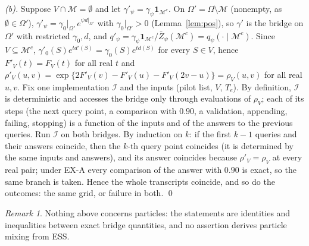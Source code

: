 \documentclass[11pt]{article}
\theoremstyle{remark}
\newtheorem{remark}[lemma]{Remark}
\newcommand{\Zb}{\bar Z}
\newcommand{\M}{\mathcal{M}}
\begin{document}
\emph{(b).} Suppose $V\cap\M=\emptyset$ and let $\gamma'_\psi=\gamma_\psi\mathbf 1_{\M^c}$. On $\Omega'=\Omega\setminus\M$ (nonempty, as $\emptyset\in\Omega'$), $\gamma'_\psi=\gamma_0|_{\Omega'}\,e^{\psi d|_{\Omega'}}$ with $\gamma_0|_{\Omega'}>0$ (Lemma~\ref{lem:pos}), so $\gamma'$ is the bridge on $\Omega'$ with restricted $\gamma_0,d$, and $q'_\psi=\gamma_\psi\mathbf 1_{\M^c}/\Zb_\psi(\M^c)=q_\psi(\cdot\mid\M^c)$. Since $V\subseteq\M^c$, $\gamma'_0(S)e^{td'(S)}=\gamma_0(S)e^{td(S)}$ for every $S\in V$, hence $F'_V(t)=F_V(t)$ for all real $t$ and $\rho'_V(u,v)=\exp\{2F'_V(v)-F'_V(u)-F'_V(2v-u)\}=\rho_V(u,v)$ for all real $u,v$.
Fix one implementation $\mathcal I$ and the inputs (pilot list, $V$, $T_e$). By definition, $\mathcal I$ is deterministic and accesses the bridge only through evaluations of $\rho_V$; each of its steps (the next query point, a comparison with $0.90$, a validation, appending, failing, stopping) is a function of the inputs and of the answers to the previous queries. Run $\mathcal I$ on both bridges. By induction on $k$: if the first $k-1$ queries and their answers coincide, then the $k$-th query point coincides (it is determined by the same inputs and answers), and its answer coincides because $\rho'_V=\rho_V$ at every real pair; under EX-A every comparison of the answer with $0.90$ is exact, so the same branch is taken. Hence the whole transcripts coincide, and so do the outcomes: the same grid, or failure in both. \qed

\begin{remark}
Nothing above concerns particles: the statements are identities and inequalities between exact bridge quantities, and no assertion derives particle mixing from ESS.
\end{remark}

\appendix
\end{document}
